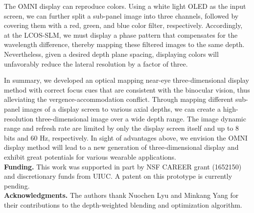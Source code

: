 \documentclass[9pt,twocolumn,twoside]{osajnl}
\begin{document}
The OMNI display can reproduce colors. Using a white light OLED as the input screen, we can further split a sub-panel image into three channels, followed by covering them with a red, green, and blue color filter, respectively. Accordingly, at the LCOS-SLM, we must display a phase pattern that compensates for the wavelength difference, thereby mapping these filtered images to the same depth. Nevertheless, given a desired depth plane spacing, displaying colors will unfavorably reduce the lateral resolution by a factor of three.\par
In summary, we developed an optical mapping near-eye three-dimensional display method with correct focus cues that are consistent with the binocular vision, thus alleviating the vergence-accommodation conflict. Through mapping different sub-panel images of a display screen to various axial depths, we can create a high-resolution three-dimensional image over a wide depth range. The image dynamic range and refresh rate are limited by only the display screen itself and up to 8 bits and 60 Hz, respectively. In sight of advantages above, we envision the OMNI display method will lead to a new generation of three-dimensional display and exhibit great potentials for various wearable applications.\\

\noindent\textbf{Funding.} This work was supported in part by NSF CAREER grant (1652150) and discretionary funds from UIUC. A patent on this prototype is currently pending.\\

\noindent\textbf{Acknowledgments.} The authors thank Nuochen Lyu and Minkang Yang for their contributions to the depth-weighted blending and optimization algorithm.

\end{document}
